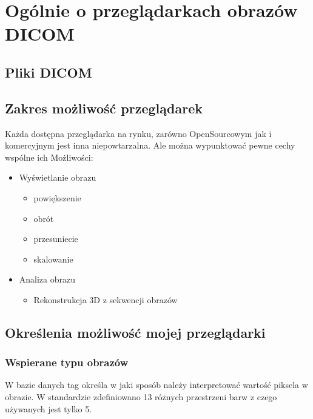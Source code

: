 \section{Ogólnie o przeglądarkach obrazów DICOM}

\subsection{Pliki DICOM}

\subsection{Zakres możliwość przeglądarek}

Każda dostępna przeglądarka na rynku, zarówno OpenSourcowym jak i komercyjnym jest inna niepowtarzalna.
Ale można wypunktować pewne cechy wspólne ich Możliwości:

\begin{itemize}
    \item Wyświetlanie obrazu
    \begin{itemize}
        \item powiększenie
        \item obrót
        \item przesuniecie
        \item skalowanie
    \end{itemize}
    \item Analiza obrazu
    \begin{itemize}
        \item Rekonstrukcja 3D z sekwencji obrazów
    \end{itemize}
\end{itemize}


\subsection{Określenia możliwość mojej przeglądarki}

\subsubsection{Wspierane typu obrazów}

W bazie danych tag  określa w jaki sposób należy interpretować wartość piksela w obrazie.
W standardzie zdefiniowano 13 różnych przestrzeni barw  z czego używanych jest tylko 5.


